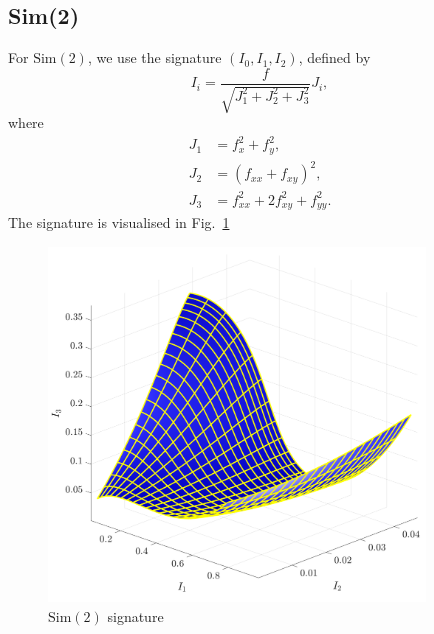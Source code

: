 \documentclass[11pt]{article}
\begin{document}
\subsection{Sim(2)}
For $\text{Sim}(2)$, we use the signature $(I_0, I_1, I_2)$, defined by
\begin{equation}\label{eq:sim2sig}
  I_i = \frac{f}{\sqrt{J_1^2 + J_2^2 + J_3^2}} J_i,
\end{equation}
where
\begin{equation*}
  \begin{split} 
    J_1 &= f_x^2 + f_y^2, \\
    J_2 &= (f_{xx} + f_{xy})^2, \\
    J_3 &= f_{xx}^2 + 2f_{xy}^2 + f_{yy}^2.
  \end{split}
\end{equation*}
The signature is visualised in Fig.~\ref{fig:sim2signature}
\begin{figure}
  \centering
    \includegraphics[width=10cm]{figures/Sim2_signature}
    \caption{$\text{Sim}(2)$ signature}
    \label{fig:sim2signature}
\end{figure}
\end{document}
